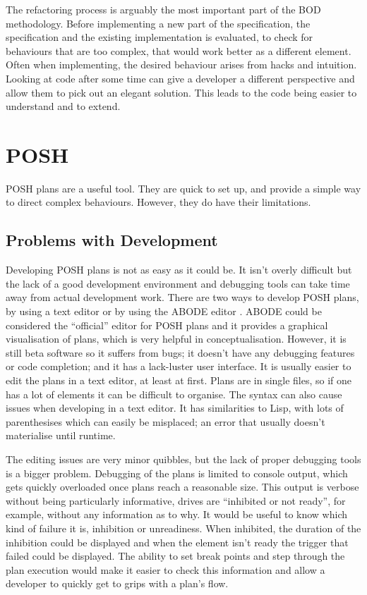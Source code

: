 \documentclass[11pt,openright,a4paper]{report}
\begin{document}
The refactoring process is arguably the most important part of the BOD methodology. Before implementing a new part of the specification, the specification and the existing implementation is evaluated, to check for behaviours that are too complex, that would work better as a different element. Often when implementing, the desired behaviour arises from hacks and intuition. Looking at code after some time can give a developer a different perspective and allow them to pick out an elegant solution. This leads to the code being easier to understand and to extend.

\section{POSH}

POSH plans are a useful tool. They are quick to set up, and provide a simple way to direct complex behaviours. However, they do have their limitations.

\subsection{Problems with Development}
\label{POSHDev}
Developing POSH plans is not as easy as it could be. It isn't overly difficult but the lack of a good development environment and debugging tools can take time away from actual development work. There are two ways to develop POSH plans, by using a text editor or by using the ABODE editor \cite{abode}. ABODE could be considered the ``official'' editor for POSH plans and it provides a graphical visualisation of plans, which is very helpful in conceptualisation. However, it is still beta software so it suffers from bugs; it doesn't have any debugging features or code completion; and it has a lack-luster user interface. It is usually easier to edit the plans in a text editor, at least at first. Plans are in single files, so if one has a lot of elements it can be difficult to organise.  The syntax can also cause issues when developing in a text editor. It has similarities to Lisp, with lots of parenthesises which can easily be misplaced; an error that usually doesn't materialise until runtime.

The editing issues are very minor quibbles, but the lack of proper debugging tools is a bigger problem. Debugging of the plans is limited to console output, which gets quickly overloaded once plans reach a reasonable size. This output is verbose without being particularly informative, drives are ``inhibited or not ready'', for example, without any information as to why. It would be useful to know which kind of failure it is, inhibition or unreadiness. When inhibited, the duration of the inhibition could be displayed and when the element isn't ready the trigger that failed could be displayed. The ability to set break points and step through the plan execution would make it easier to check this information and allow a developer to quickly get to grips with a plan's flow.
\end{document}

